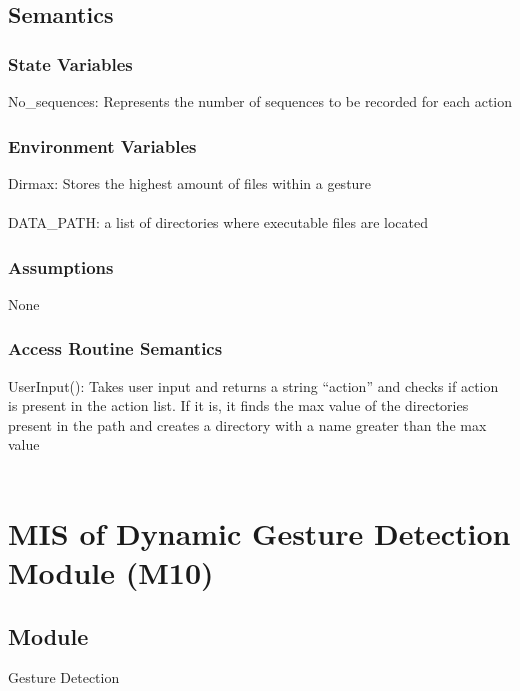 \documentclass[12pt, titlepage]{article}
\begin{document}
\subsection{Semantics}

\subsubsection{State Variables}

No\_sequences: Represents the number of sequences to be recorded for each action

\subsubsection{Environment Variables}

Dirmax: Stores the highest amount of files within a gesture\\
\\
DATA\_PATH:  a list of directories where executable files are located\\

\subsubsection{Assumptions}

None\\

\subsubsection{Access Routine Semantics}

UserInput(): Takes user input and returns a string “action” and checks if action is present in the action list. If it is, it finds the max value of the directories present in the path and creates a directory with a name greater than the max value\\

~\newpage

\section{MIS of Dynamic Gesture Detection Module (M10)} \label{M10}

\subsection{Module}

Gesture Detection\\
\end{document}
